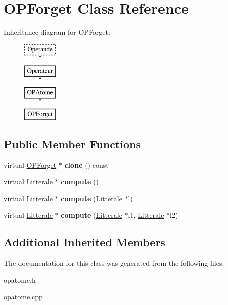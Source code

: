 \hypertarget{class_o_p_forget}{}\section{O\+P\+Forget Class Reference}
\label{class_o_p_forget}
Inheritance diagram for O\+P\+Forget\+:\begin{figure}[H]
\begin{center}
\leavevmode
\includegraphics[height=4.000000cm]{class_o_p_forget}
\end{center}
\end{figure}
\subsection*{Public Member Functions}
\begin{DoxyCompactItemize}
\item 
virtual \hyperlink{class_o_p_forget}{O\+P\+Forget} $\ast$ {\bfseries clone} () const \hypertarget{class_o_p_forget_a2b5a61818f2a6a6124db0640b0643d56}{}\label{class_o_p_forget_a2b5a61818f2a6a6124db0640b0643d56}

\item 
virtual \hyperlink{class_litterale}{Litterale} $\ast$ {\bfseries compute} ()\hypertarget{class_o_p_forget_a2ceb2c96d61919e2b766529ea22d1901}{}\label{class_o_p_forget_a2ceb2c96d61919e2b766529ea22d1901}

\item 
virtual \hyperlink{class_litterale}{Litterale} $\ast$ {\bfseries compute} (\hyperlink{class_litterale}{Litterale} $\ast$l)\hypertarget{class_o_p_forget_a0dc97aa82ffccff2fbd59cf98824fa03}{}\label{class_o_p_forget_a0dc97aa82ffccff2fbd59cf98824fa03}

\item 
virtual \hyperlink{class_litterale}{Litterale} $\ast$ {\bfseries compute} (\hyperlink{class_litterale}{Litterale} $\ast$l1, \hyperlink{class_litterale}{Litterale} $\ast$l2)\hypertarget{class_o_p_forget_a767db9e2e60ce477a62492c46febc775}{}\label{class_o_p_forget_a767db9e2e60ce477a62492c46febc775}

\end{DoxyCompactItemize}
\subsection*{Additional Inherited Members}


The documentation for this class was generated from the following files\+:\begin{DoxyCompactItemize}
\item 
opatome.\+h\item 
opatome.\+cpp\end{DoxyCompactItemize}
